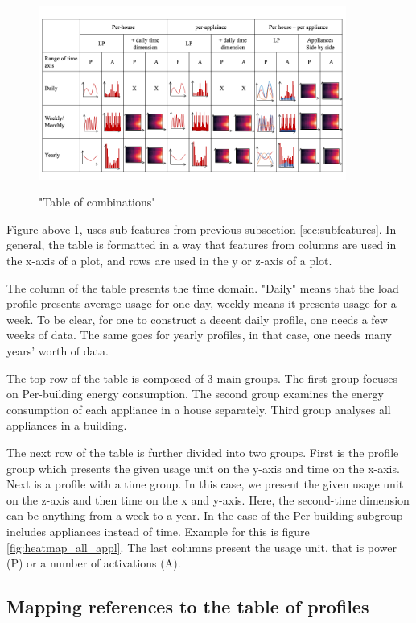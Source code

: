 \begin{figure}[H]
	\centering
	\caption{"Table of combinations"}
	\includegraphics[width=0.9\textwidth]{Figures/profile_sketches/Slide14.png}
	\label{fig:map_fig}
\end{figure}

Figure above \ref{fig:map_fig}, uses sub-features from previous subsection \ref{sec:subfeatures}. 
In general, the table is formatted in a way that features from columns are
used in the x-axis of a plot, and rows are used in the y or z-axis of a plot. 

The column of the table presents the time domain. "Daily" means that the load profile presents
average usage for one day, weekly means it presents usage for a week.
To be clear, for one to construct a decent daily profile, one needs a few
weeks of data. The same goes for yearly profiles, in that case, one needs many years' worth of data. 

The top row of the table is composed of 3 main groups. 
The first group focuses on Per-building energy consumption.
The second group examines the energy consumption of each appliance in a house separately.
Third group analyses all appliances in a building.

The next row of the table is further divided into two groups. First is the profile group
which presents the given usage unit on the y-axis and time on the x-axis. 
Next is a profile with a time group. 
In this case, we present the given usage unit on the z-axis and then time on the x and y-axis.
Here, the second-time dimension can be anything from a week to a year.
In the case of the Per-building subgroup includes appliances instead of time. 
Example for this is figure \ref{fig:heatmap_all_appl}.
The last columns present the usage unit, that is power (P) or a number of activations (A).

\subsection{Mapping references to the table of profiles}

